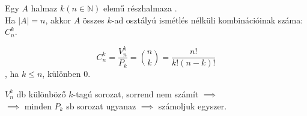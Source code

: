 \begin{frame}
  \begin{tcolorbox}[title={Def.: Ismétlés nélküli Kombináció}]
    Egy $A$ halmaz $k (n \in \mathbb{N})$ elemű részhalmaza .\\
    Ha $|A| = n$, akkor $A$ összes $k$-ad osztályú ismétlés nélküli kombinációinak száma: $C_n^k$.
  \end{tcolorbox}

  \begin{tcolorbox}[title={Tétel: Kombinációk száma}]
    $$C_n^k = \frac{V_n^k}{P_k} = {{n}\choose{k}} = \frac{n!}{k!(n - k)!} $$, ha $k \leq n$, különben $0$.
  \tcblower
    \\
    \mmedskip

    $V_n^k$ db különböző $k$-tagú sorozat, sorrend nem számít $\implies$\\
    $\implies$ minden $P_k$ sb sorozat ugyanaz $\implies$ számoljuk egyszer.\\
  \end{tcolorbox}
\end{frame}

